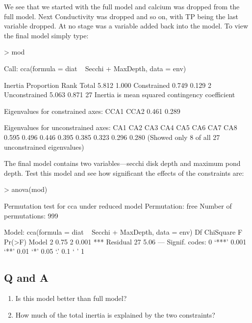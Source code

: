 \documentclass[a4paper,10pt]{article}
\begin{document}
We see that we started with the full model and calcium was dropped from the full model. Next Conductivity was dropped and so on, with TP being the last variable dropped. At no stage was a variable added back into the model. To view the final model simply type:

\begin{Schunk}
\begin{Sinput}
> mod
\end{Sinput}
\begin{Soutput}
Call: cca(formula = diat ~ Secchi + MaxDepth, data = env)

              Inertia Proportion Rank
Total           5.812      1.000     
Constrained     0.749      0.129    2
Unconstrained   5.063      0.871   27
Inertia is mean squared contingency coefficient 

Eigenvalues for constrained axes:
 CCA1  CCA2 
0.461 0.289 

Eigenvalues for unconstrained axes:
  CA1   CA2   CA3   CA4   CA5   CA6   CA7   CA8 
0.595 0.496 0.446 0.395 0.385 0.323 0.296 0.280 
(Showed only 8 of all 27 unconstrained eigenvalues)
\end{Soutput}
\end{Schunk}

The final model contains two variables---secchi disk depth and maximum pond depth. Test this model and see how significant the effects of the constraints are:

\begin{Schunk}
\begin{Sinput}
> anova(mod)
\end{Sinput}
\end{Schunk}

\begin{Schunk}
\begin{Soutput}
Permutation test for cca under reduced model
Permutation: free
Number of permutations: 999

Model: cca(formula = diat ~ Secchi + MaxDepth, data = env)
         Df ChiSquare  F Pr(>F)    
Model     2      0.75  2  0.001 ***
Residual 27      5.06              
---
Signif. codes:  0 ‘***’ 0.001 ‘**’ 0.01 ‘*’ 0.05 ‘.’ 0.1 ‘ ’ 1
\end{Soutput}
\end{Schunk}

\subsection*{Q and A}
\begin{enumerate}
\item Is this model better than full model?
\item How much of the total inertia is explained by the two constraints?
\end{enumerate}
\end{document}
